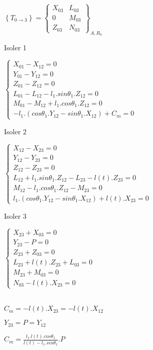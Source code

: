 {$\left\{T_{0\rightarrow 3}\right\}=\left\{\begin{array}{cc}
X_{03} & L_{03} \\
0 & M_{03} \\
Z_{03} & N_{03}
\end{array}\right\}_{A,R_0}$

Isoler 1

$\left\{\begin{array}{l}
X_{01}-X_{12}=0 \\
Y_{01}-Y_{12}=0 \\
Z_{01}-Z_{12}=0 \\
L_{01}-L_{12}-l_1.sin\theta_1.Z_{12}=0 \\
M_{01}-M_{12}+l_1.cos\theta_1.Z_{12}=0 \\
-l_1.(cos\theta_1.Y_{12}-sin\theta_1.X_{12})+C_m=0
\end{array}\right.$

Isoler 2

$\left\{\begin{array}{l}
X_{12}-X_{23}=0 \\
Y_{12}-Y_{23}=0 \\
Z_{12}-Z_{23}=0 \\
L_{12}+l_1.sin\theta_1.Z_{12}-L_{23}-l(t).Z_{23}=0 \\
M_{12}-l_1.cos\theta_1.Z_{12}-M_{23}=0 \\
l_1.(cos\theta_1.Y_{12}-sin\theta_1.X_{12})+l(t).X_{23}=0
\end{array}\right.$

Isoler 3

$\left\{\begin{array}{l}
X_{23}+X_{03}=0 \\
Y_{23}-P=0 \\
Z_{23}+Z_{03}=0 \\
L_{23}+l(t).Z_{23}+L_{03}=0 \\
M_{23}+M_{03}=0 \\
N_{03}-l(t).X_{23}=0
\end{array}\right.$

~\ \\
$C_m=-l(t).X_{23}=-l(t).X_{12}$

$Y_{23}=P=Y_{12}$

$C_m=\frac{l_1.l(t).cos\theta_1}{l(t)-l_1.sin\theta_1}.P$
}


